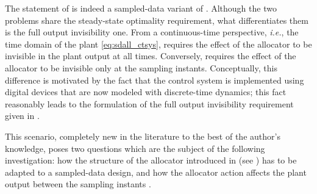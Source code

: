 \begin{remark}
  \label{rem:sdall_fullinvprb}
  The statement of  is indeed a sampled-data variant of . Although the two problems share the steady-state optimality requirement, what differentiates them is the full output invisibility one. From a continuous-time perspective, \emph{i.e.}, the time domain of the plant \eqref{eq:sdall_ctsys},  requires the effect of the allocator to be invisible in the plant output at all times. Conversely,  requires the effect of the allocator to be invisible only at the sampling instants. Conceptually, this difference is motivated by the fact that the control system is implemented using digital devices that are now modeled with discrete-time dynamics; this fact reasonably leads to the formulation of the full output invisibility requirement given in .\closeremark
\end{remark}

This scenario, completely new in the literature to the best of the author's knowledge, poses two questions which are the subject of the following investigation: how the structure of the allocator introduced in  (see ) has to be adapted to a sampled-data design, and how the allocator action affects the plant output between the sampling instants \cite{galeani_dynamic_2022}.

